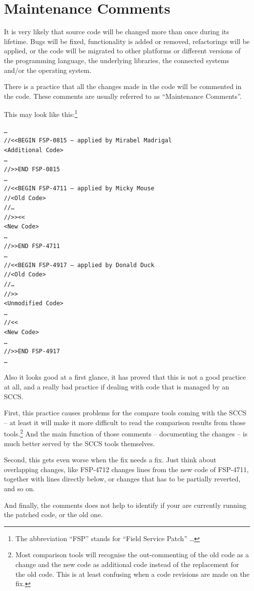 \documentclass[11pt,a4paper, titlepage, parskip=half, headsepline, footsepline, cleardoublepage=current, headheight=1cm]{scrbook}
\begin{document}

\section{Maintenance Comments}\label{sec:MaintenanceComments}
It is very likely that source code will be changed more than once during its lifetime. Bugs will be fixed, functionality is added or removed, refactorings will be applied, or the code will be migrated to other platforms or different versions of the programming language, the underlying libraries, the connected systems and/or the operating system.

There is a practice that all the changes made in the code will be commented in the code. These comments are usually referred to as “Maintenance Comments”.

This may look like this:\footnote{The abbreviation “FSP” stands for “Field Service Patch” …}
\begin{lstlisting}
…
//<<BEGIN FSP-0815 – applied by Mirabel Madrigal
<Additional Code>
…
//>>END FSP-0815
…
//<<BEGIN FSP-4711 – applied by Micky Mouse
//<Old Code>
//…
//>><<
<New Code>
…
//>>END FSP-4711
…
//<<BEGIN FSP-4917 – applied by Donald Duck
//<Old Code>
//…
//>>
<Unmodified Code>
…
//<<
<New Code>
…
//>>END FSP-4917
…
\end{lstlisting}

Also it looks good at a first glance, it has proved that this is not a good practice at all, and a really bad practice if dealing with code that is managed by an SCCS.

First, this practice causes problems for the compare tools coming with the SCCS – at least it will make it more difficult to read the comparison results from those tools.\footnote{Most comparison tools will recognise the out-commenting of the old code as a change and the new code as additional code instead of the replacement for the old code. This is at least confusing when a code revisions are made on the fix.} And the main function of those comments – documenting the changes – is much better served by the SCCS tools themselves.

Second, this gets even worse when the fix needs a fix. Just think about overlapping changes, like FSP-4712 changes lines from the new code of FSP-4711, together with lines directly below, or changes that has to be partially reverted, and so on.

And finally, the comments does not help to identify if your are currently running the patched code, or the old one.
\end{document}
